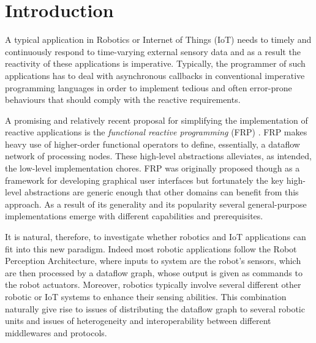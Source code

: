 \documentclass[sigplan,screen]{acmart}
\begin{document}

\maketitle

\section{Introduction} \label{sec:introduction}

A typical application in Robotics or Internet of Things (IoT) needs to timely and
continuously respond to time-varying external sensory data and as a result the
reactivity of these applications is imperative. Typically, the programmer of such
applications has to deal with asynchronous callbacks in conventional imperative
programming languages in order to implement tedious and often error-prone behaviours
that should comply with the reactive requirements.

A promising and relatively recent proposal for simplifying the implementation of
reactive applications is the \emph{functional reactive programming} (FRP) \cite{fran}.
FRP makes heavy use of higher-order functional operators to define, essentially, a
dataflow network of processing nodes. These high-level abstractions
alleviates, as intended, the low-level implementation chores. FRP was originally proposed
though as a framework for developing graphical user interfaces but fortunately the key
high-level abstractions are generic enough that other domains can benefit from this
approach. As a result of its generality and its popularity several general-purpose
implementations emerge with different capabilities and prerequisites.

It is natural, therefore, to investigate whether robotics and IoT applications
can fit into this new paradigm. Indeed most robotic applications follow the
Robot Perception Architecture, where inputs to system are the robot's
sensors, which are then processed by a dataflow graph, whose output is given as
commands to the robot actuators. Moreover, robotics typically involve several
different other robotic or IoT systems to enhance their sensing abilities. This
combination naturally give rise to issues of distributing the dataflow graph to
several robotic units and issues of heterogeneity and interoperability between
different middlewares and protocols.
\end{document}

